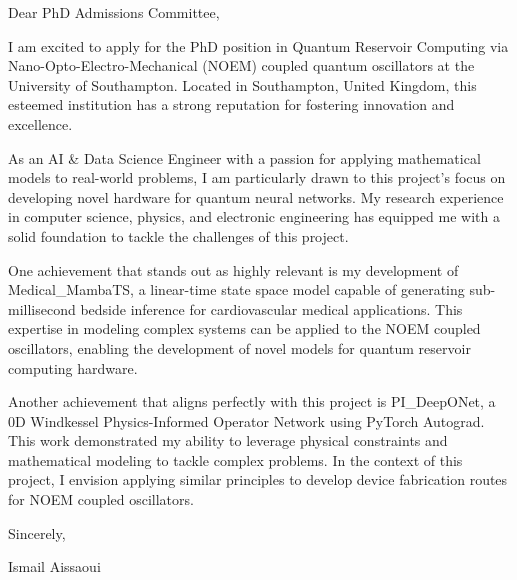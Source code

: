 \documentclass{letter}
\begin{document}
\opening{Dear PhD Admissions Committee,}

I am excited to apply for the PhD position in Quantum Reservoir Computing via Nano-Opto-Electro-Mechanical (NOEM) coupled quantum oscillators at the University of Southampton. Located in Southampton, United Kingdom, this esteemed institution has a strong reputation for fostering innovation and excellence.

As an AI & Data Science Engineer with a passion for applying mathematical models to real-world problems, I am particularly drawn to this project's focus on developing novel hardware for quantum neural networks. My research experience in computer science, physics, and electronic engineering has equipped me with a solid foundation to tackle the challenges of this project.

One achievement that stands out as highly relevant is my development of Medical_MambaTS, a linear-time state space model capable of generating sub-millisecond bedside inference for cardiovascular medical applications. This expertise in modeling complex systems can be applied to the NOEM coupled oscillators, enabling the development of novel models for quantum reservoir computing hardware.

Another achievement that aligns perfectly with this project is PI_DeepONet, a 0D Windkessel Physics-Informed Operator Network using PyTorch Autograd. This work demonstrated my ability to leverage physical constraints and mathematical modeling to tackle complex problems. In the context of this project, I envision applying similar principles to develop device fabrication routes for NOEM coupled oscillators.

\closing{Sincerely,}
Ismail Aissaoui

\enddocument
\end{document}

